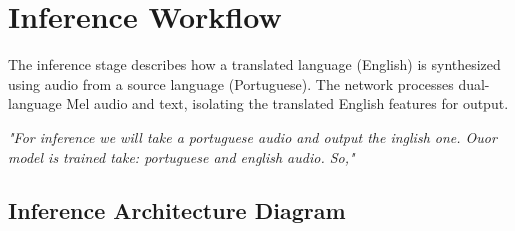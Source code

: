 \documentclass[11pt]{article}
\begin{document}
\section{Inference Workflow}

The inference stage describes how a translated language (English) is synthesized using audio from a source language (Portuguese). The network processes dual-language Mel audio and text, isolating the translated English features for output.

\textit{"For inference we will take a portuguese audio and output the inglish one. Ouor model is trained take: portuguese and english audio. So,"}

\subsection{Inference Architecture Diagram}
\end{document}
